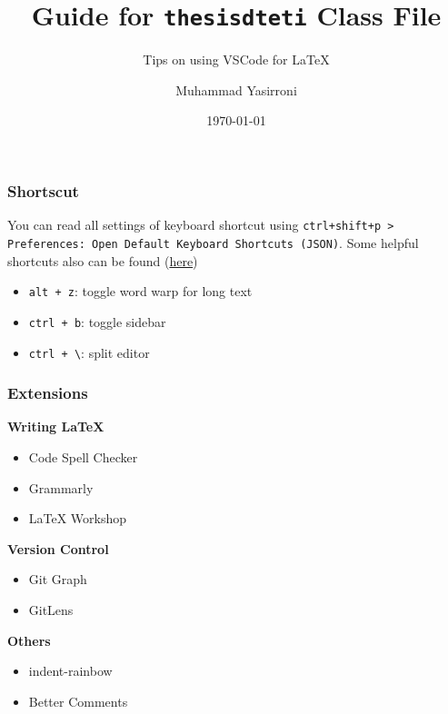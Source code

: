 \documentclass{beamer}
\title{Guide for \texttt{thesisdteti} Class File}
\subtitle{Tips on using VSCode for LaTeX}
\author{Muhammad Yasirroni}
\institute{Universitas Gadjah Mada}
\date{\today}
\begin{document}
\begin{frame}
  \titlepage
\end{frame}

\begin{frame}[fragile]
  \frametitle{Shortscut}

  You can read all settings of keyboard shortcut using \texttt{ctrl+shift+p > Preferences: Open Default Keyboard Shortcuts (JSON)}. Some helpful shortcuts also can be found (\href{https://gist.github.com/bradtraversy/b28a0a361880141af928ada800a671d9}{here})
  \begin{itemize}
    \item \texttt{alt + z}: toggle word warp for long text
    \item \texttt{ctrl + b}: toggle sidebar
    \item \verb|ctrl + \|: split editor
  \end{itemize}
\end{frame}

\begin{frame}
    \frametitle{Extensions}

    \textbf{Writing LaTeX}
    \begin{itemize}
      \item Code Spell Checker
      \item Grammarly
      \item LaTeX Workshop
    \end{itemize}

    \textbf{Version Control}
    \begin{itemize}
        \item Git Graph
        \item GitLens
    \end{itemize}

    \textbf{Others}
    \begin{itemize}
        \item indent-rainbow
        \item Better Comments
    \end{itemize}

\end{frame}
\end{document}

